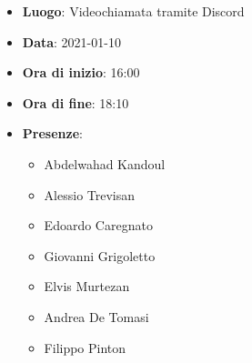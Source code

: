 \begin{itemize}
    \item \textbf{Luogo}: Videochiamata tramite Discord
    \item \textbf{Data}: 2021-01-10
    \item \textbf{Ora di inizio}: 16:00
    \item \textbf{Ora di fine}: 18:10
    \item \textbf{Presenze}:
          \begin{itemize}
            \item Abdelwahad Kandoul
            \item Alessio Trevisan
            \item Edoardo Caregnato
            \item Giovanni Grigoletto
            \item Elvis Murtezan
            \item Andrea De Tomasi
            \item Filippo Pinton
          \end{itemize}
\end{itemize}
